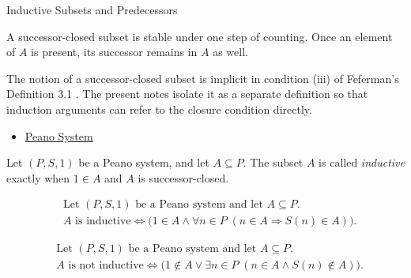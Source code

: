 \begin{topicbox}{Inductive Subsets and Predecessors}
\begin{remark*}[Interpretation]
A successor-closed subset is stable under one step of counting. Once an
element of $A$ is present, its successor remains in $A$ as well.
\end{remark*}

\begin{remark*}
The notion of a successor-closed subset is implicit in condition (iii) of
Feferman's Definition 3.1 \citep{FefermanNumberSystems1964}. The present notes
isolate it as a separate definition so that induction arguments can refer to
the closure condition directly.
\end{remark*}

\begin{dependencies}
\begin{itemize}
  \item \hyperref[def:peano-system]{Peano System}
\end{itemize}
\end{dependencies}

\begin{tcolorbox}[colback=defbox, colframe=defborder, arc=2pt,
  left=6pt, right=6pt, top=4pt, bottom=4pt,
  title={\small\textbf{Definition (Inductive Subset of a Peano System)}} ,
  fonttitle=\small\bfseries]
\begin{definition}
\label{def:inductive-subset-of-peano-system}
Let $(P,S,1)$ be a Peano system, and let $A \subseteq P$. The subset $A$ is
called \emph{inductive} exactly when $1 \in A$ and $A$ is successor-closed.
\end{definition}
\end{tcolorbox}

\begin{remark*}
\[
\begin{aligned}
&\text{Let } (P,S,1) \text{ be a Peano system and let } A \subseteq P.\\
&A \text{ is inductive}
\Longleftrightarrow
\bigl(1 \in A \land
\forall n \in P\;(n \in A \Longrightarrow S(n) \in A)\bigr).
\end{aligned}
\]
\end{remark*}

\begin{remark*}
\[
\begin{aligned}
&\text{Let } (P,S,1) \text{ be a Peano system and let } A \subseteq P.\\
&A \text{ is not inductive}
\Longleftrightarrow
\bigl(1 \notin A \lor \exists n \in P\;(n \in A \land S(n) \notin A)\bigr).
\end{aligned}
\]
\end{remark*}


\end{topicbox}
